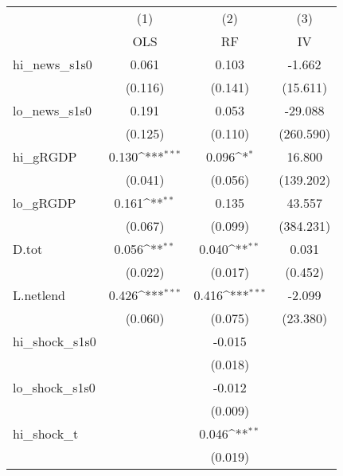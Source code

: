 {
\def\sym#1{\ifmmode^{#1}\else\(^{#1}\)\fi}
\begin{tabular}{l*{3}{c}}
\toprule
            &\multicolumn{1}{c}{(1)}&\multicolumn{1}{c}{(2)}&\multicolumn{1}{c}{(3)}\\
            &\multicolumn{1}{c}{OLS}&\multicolumn{1}{c}{RF}&\multicolumn{1}{c}{IV}\\
\midrule
hi\_news\_s1s0&       0.061         &       0.103         &      -1.662         \\
            &     (0.116)         &     (0.141)         &    (15.611)         \\
\addlinespace
lo\_news\_s1s0&       0.191         &       0.053         &     -29.088         \\
            &     (0.125)         &     (0.110)         &   (260.590)         \\
\addlinespace
hi\_gRGDP    &       0.130\sym{***}&       0.096\sym{*}  &      16.800         \\
            &     (0.041)         &     (0.056)         &   (139.202)         \\
\addlinespace
lo\_gRGDP    &       0.161\sym{**} &       0.135         &      43.557         \\
            &     (0.067)         &     (0.099)         &   (384.231)         \\
\addlinespace
D.tot       &       0.056\sym{**} &       0.040\sym{**} &       0.031         \\
            &     (0.022)         &     (0.017)         &     (0.452)         \\
\addlinespace
L.netlend   &       0.426\sym{***}&       0.416\sym{***}&      -2.099         \\
            &     (0.060)         &     (0.075)         &    (23.380)         \\
\addlinespace
hi\_shock\_s1s0&                     &      -0.015         &                     \\
            &                     &     (0.018)         &                     \\
\addlinespace
lo\_shock\_s1s0&                     &      -0.012         &                     \\
            &                     &     (0.009)         &                     \\
\addlinespace
hi\_shock\_t  &                     &       0.046\sym{**} &                     \\
            &                     &     (0.019)         &                     \\

\end{tabular}}
